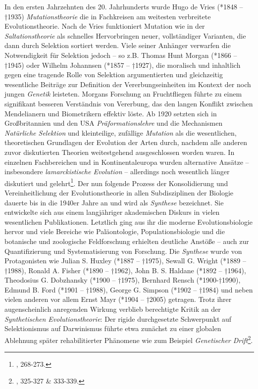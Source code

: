 \documentclass[openany,twoside,twocolumn]{book}
\let\rmarkdownfootnote\footnote%
\def\footnote{\protect\rmarkdownfootnote}
\begin{document}
In den ersten Jahrzehnten des 20. Jahrhunderts wurde Hugo de Vries
(*1848 -- †1935) \emph{Mutationstheorie} die in Fachkreisen am weitesten
verbreitete Evolutionstheorie. Nach de Vries funktioniert Mutation wie
in der \emph{Saltationstheorie} als schnelles Hervorbringen neuer,
vollständiger Varianten, die dann durch Selektion sortiert werden. Viele
seiner Anhänger verwarfen die Notwendigkeit für Selektion jedoch -- so
z.B. Thomas Hunt Morgan (*1866 -- †1945) oder Wilhelm Johannsen (*1857
-- †1927), die moralisch und inhaltlich gegen eine tragende Rolle von
Selektion argumentierten und gleichzeitig wesentliche Beiträge zur
Definition der Vererbungseinheiten im Kontext der noch jungen
\emph{Genetik} leisteten. Morgans Forschung an Fruchtfliegen führte zu
einem signifikant besseren Verständnis von Vererbung, das den langen
Konflikt zwischen Mendelianern und Biometrikern effektiv löste. Ab 1920
setzten sich in Großbritannien und den USA \emph{Präformationslehre} und
die Mechanismen \emph{Natürliche Selektion} und kleinteilige, zufällige
\emph{Mutation} als die wesentlichen, theoretischen Grundlagen der
Evolution der Arten durch, nachdem alle anderen zuvor diskutierten
Theorien weitestgehend ausgeschlossen worden waren. In einzelnen
Fachbereichen und in Kontinentaleuropa wurden alternative Ansätze --
insbesondere \emph{lamarckistische Evolution} -- allerdings noch
wesentlich länger diskutiert und gelehrt\footnote{\textcite{bowler_evolution_1989},
  268-273.}. Der nun folgende Prozess der Konsolidierung und
Vereinheitlichung der Evolutionstheorie in allen Subdisziplinen der
Biologie dauerte bis in die 1940er Jahre an und wird als \emph{Synthese}
bezeichnet. Sie entwickelte sich aus einem langjähriger akademischen
Diskurs in vielen wesentlichen Publikationen. Letztlich ging aus ihr die
moderne Evolutionsbiologie hervor und viele Bereiche wie Paläontologie,
Populationsbiologie und die botanische und zoologische Feldforschung
erhielten deutliche Anstöße -- auch zur Quantifizierung und
Systematisierung von Forschung. Die \emph{Synthese} wurde von
Protagonisten wie Julian S. Huxley (*1887 -- †1975), Sewall G. Wright
(*1889 -- †1988), Ronald A. Fisher (*1890 -- †1962), John B. S. Haldane
(*1892 -- †1964), Theodosius G. Dobzhansky (*1900 -- †1975), Bernhard
Rensch (*1900-†1990), Edmund B. Ford (*1901 -- †1988), George G. Simpson
(*1902 -- †1984) und neben vielen anderen vor allem Ernst Mayr (*1904 --
†2005) getragen. Trotz ihrer augenscheinlich anregenden Wirkung verblieb
berechtigte Kritik an der \emph{Synthetischen Evolutionstheorie}: Der
rigide durchgesetzte Schwerpunkt auf Selektionismus auf Darwinismus
führte etwa zunächst zu einer globalen Ablehnung später rehabilitierter
Phänomene wie zum Beispiel \emph{Genetischer Drift}\footnote{\textcite{bowler_evolution_1989},
  325-327 \& 333-339.}.
\end{document}

